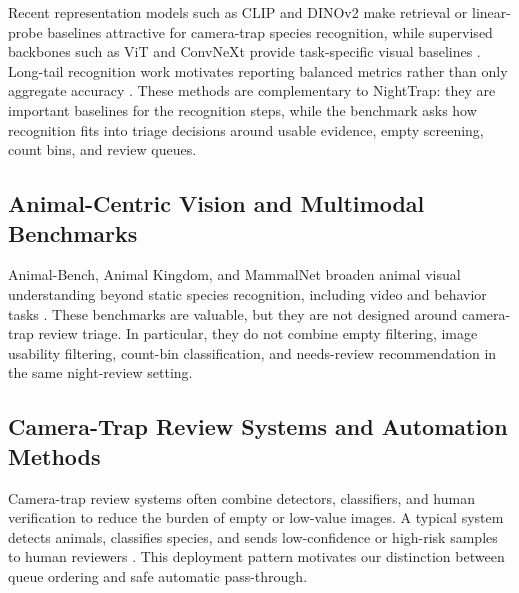 \documentclass{article}
\begin{document}
Recent representation models such as CLIP and DINOv2 make retrieval or linear-probe baselines attractive for camera-trap species recognition, while supervised backbones such as ViT and ConvNeXt provide task-specific visual baselines \citep{radford2021clip,oquab2023dinov2,dosovitskiy2021vit,liu2022convnext}. Long-tail recognition work motivates reporting balanced metrics rather than only aggregate accuracy \citep{gupta2019lvis,vanhorn2018inaturalist,lin2017focalloss}. These methods are complementary to NightTrap: they are important baselines for the recognition steps, while the benchmark asks how recognition fits into triage decisions around usable evidence, empty screening, count bins, and review queues.



\subsection{Animal-Centric Vision and Multimodal Benchmarks}

Animal-Bench, Animal Kingdom, and MammalNet broaden animal visual understanding beyond static species recognition, including video and behavior tasks \citep{jing2024animalbench,ng2022animalkingdom,chen2023mammalnet}. These benchmarks are valuable, but they are not designed around camera-trap review triage. In particular, they do not combine empty filtering, image usability filtering, count-bin classification, and needs-review recommendation in the same night-review setting.



\subsection{Camera-Trap Review Systems and Automation Methods}

Camera-trap review systems often combine detectors, classifiers, and human verification to reduce the burden of empty or low-value images. A typical system detects animals, classifies species, and sends low-confidence or high-risk samples to human reviewers \citep{beery2019pipeline}. This deployment pattern motivates our distinction between queue ordering and safe automatic pass-through.
\end{document}
